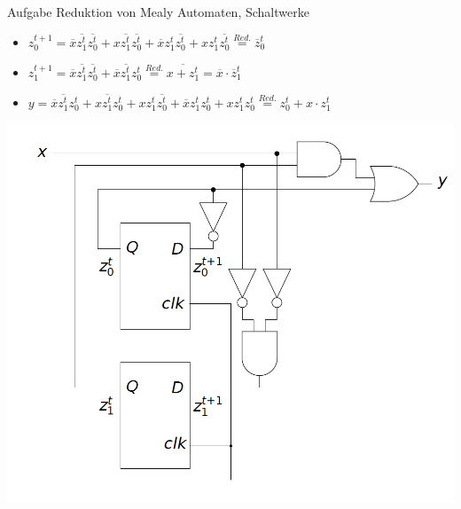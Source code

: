     \begin{frame}{Aufgabe \thesection}{Reduktion von Mealy Automaten, Schaltwerke}
      \begin{solution}
        \begin{itemize}
          \item $z_0^{t+1} = \overline{x}\overline{z_1^t}\overline{z_0^t} +  x\overline{z_1^t}\overline{z_0^t} + \overline{x}z_1^t\overline{z_0^t} + xz_1^t\overline{z_0^t} \overset{Red.}{=} \overline{z}_0^t$
          \item $z_1^{t+1} = \overline{x}\overline{z_1^t}\overline{z_0^t} + \overline{x}\overline{z_1^t}z_0^t \overset{Red.}{=} \overline{x + z_1^t} = \overline{x} \cdot \overline{z}_1^t$
          \item $y         = \overline{x}\overline{z_1^t}z_0^t + x\overline{z_1^t}z_0^t + xz_1^t\overline{z_0^t} + \overline{x}z_1^tz_0^t + xz_1^tz_0^t \overset{Red.}{=} z_0^t + x \cdot z_1^t$
        \end{itemize}
        \includegraphics[height=0.5\paperheight, center]{./figures/Mealy-reduziert-Schaltwerk.png}
      \end{solution}
    \end{frame}
